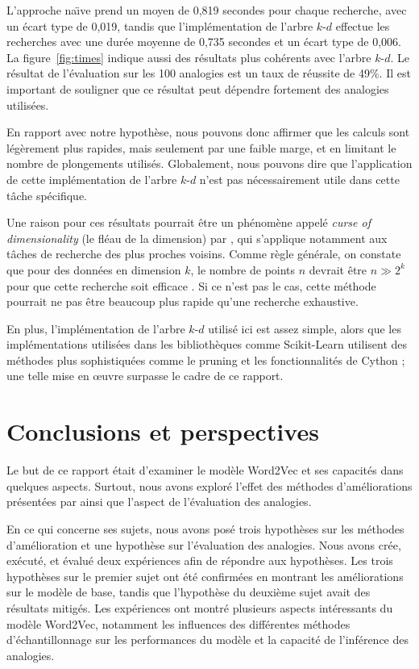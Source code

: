\documentclass[12pt]{article}
\begin{document}
L'approche na\"\i ve prend un moyen de 0{,}819 secondes pour chaque recherche, avec un écart type de 0{,}019, tandis que l'implémentation de l'arbre $k$-$d$ effectue les recherches avec une durée moyenne de 0{,}735 secondes et un écart type de 0{,}006. La figure~\ref{fig:times} indique aussi des résultats plus cohérents avec l'arbre $k$-$d$. Le résultat de l'évaluation sur les 100 analogies est un taux de réussite de 49\%. Il est important de souligner que ce résultat peut dépendre fortement des analogies utilisées.

En rapport avec notre hypothèse, nous pouvons donc affirmer que les calculs sont légèrement plus rapides, mais seulement par une faible marge, et en limitant le nombre de plongements utilisés. Globalement, nous pouvons dire que l'application de cette implémentation de l'arbre $k$-$d$ n'est pas nécessairement utile dans cette tâche spécifique.

Une raison pour ces résultats pourrait être un phénomène appelé \textit{curse of dimensionality} (le fléau de la dimension) par \cite{Freimer1961AdaptiveCP}, qui s'applique notamment aux tâches de recherche des plus proches voisins. Comme règle générale, on constate que pour des données en dimension $ k $, le nombre de points $ n $ devrait être $ n \gg 2^k $ pour que cette recherche soit efficace \citep{indyk2004nearest}. Si ce n'est pas le cas, cette méthode pourrait ne pas être beaucoup plus rapide qu'une recherche exhaustive.

En plus, l'implémentation de l'arbre $k$-$d$ utilisé ici est assez simple, alors que les implémentations utilisées dans les bibliothèques comme Scikit-Learn utilisent des méthodes plus sophistiquées comme le pruning et les fonctionnalités de Cython \citep{behnel2011cython} ; une telle mise en œuvre surpasse le cadre de ce rapport. 

\section{Conclusions et perspectives} \label{conclusions et perspectives}

Le but de ce rapport était d'examiner le modèle Word2Vec et ses capacités dans quelques aspects. Surtout, nous avons exploré l'effet des méthodes d'améliorations présentées par \cite{DBLP:conf/nips/MikolovSCCD13} ainsi que l'aspect de l'évaluation des analogies.

En ce qui concerne ses sujets, nous avons posé trois hypothèses sur les méthodes d'amélioration et une hypothèse sur l'évaluation des analogies. Nous avons crée, exécuté, et évalué deux expériences afin de répondre aux hypothèses. Les trois hypothèses sur le premier sujet ont été confirmées en montrant les améliorations sur le modèle de base, tandis que l'hypothèse du deuxième sujet avait des résultats mitigés. Les expériences ont montré plusieurs aspects intéressants du modèle Word2Vec, notamment les influences des différentes méthodes d'échantillonnage sur les performances du modèle et la capacité de l'inférence des analogies. 
\end{document}
